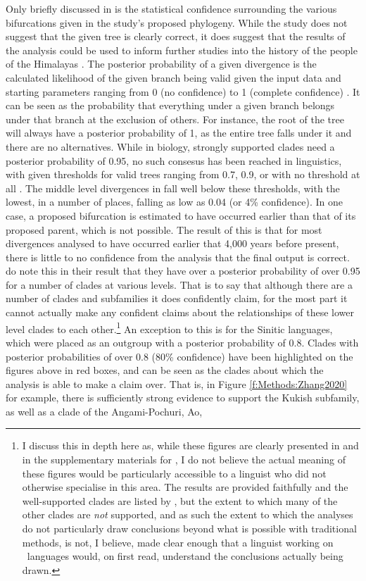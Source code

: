 Only briefly discussed in  is the statistical confidence surrounding the various bifurcations given in the study's proposed phylogeny. While the study does not suggest that the given tree is clearly correct, it does suggest that the results of the analysis could be used to inform further studies into the history of the people of the Himalayas \cite[5]{ZhangH2020Baye}. The posterior probability of a given divergence is the calculated likelihood of the given branch being valid given the input data and starting parameters ranging from 0 (no  confidence) to 1 (complete confidence) \cite{Alfaro2006}. It can be seen as the probability that everything under a given branch belongs under that branch at the exclusion of others. For instance, the root of the tree will always have a posterior probability of 1, as the entire tree falls under it and there are no alternatives. While in biology, strongly supported clades need a posterior probability of 0.95, no such consesus has been reached in linguistics, with given thresholds for valid trees ranging from 0.7, 0.9, or with no threshold at all \cite{Dolin2022}. The middle level divergences in  fall well below these thresholds, with the lowest, in a number of places, falling as low as 0.04 (or 4\% confidence). In one case, a proposed bifurcation is estimated to have occurred earlier than that of its proposed parent, which is not possible. The result of this is that for most divergences analysed to have occurred earlier that 4,000 years before present, there is little to no confidence from the analysis that the final output is correct.  do note this in their result that they have over a posterior probability of over 0.95 for a number of clades at various levels. That is to say that although there are a number of clades and subfamilies it does confidently claim, for the most part it cannot actually make any confident claims about the relationships of these lower level clades to each other.\footnote{I discuss this in depth here as, while these figures are clearly presented in  and in the supplementary materials for , I do not believe the actual meaning of these figures would be particularly accessible to a linguist who did not otherwise specialise in this area. The results are provided faithfully and the well-supported clades are listed by , but the extent to which many of the other clades are \textit{not} supported, and as such the extent to which the analyses do not particularly draw conclusions beyond what is possible with traditional methods, is not, I believe, made clear enough that a linguist working on \lfam\ languages would, on first read, understand the conclusions actually being drawn.} An exception to this is for the Sinitic languages, which were placed as an outgroup with a posterior probability of 0.8. Clades with posterior probabilities of over 0.8 (80\% confidence) have been highlighted on the figures above in red boxes, and can be seen as the clades about which the analysis is able to make a claim over. That is, in Figure \ref{f:Methods:Zhang2020} for example, there is sufficiently strong evidence to support the Kukish subfamily, as well as a clade of the Angami-Pochuri, Ao, 